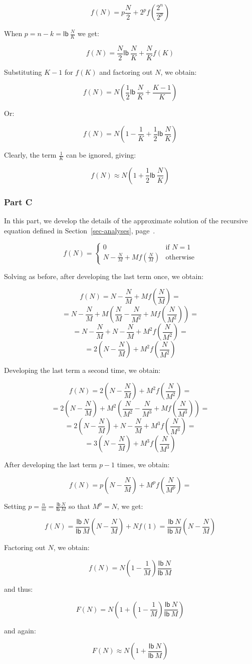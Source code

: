 \[ f(N) = p\frac{N}{2} + 2^pf(\frac{2^n}{2^p})\]

When $p = n - k = \mathsf{lb}~\frac{N}{K}$ we get:

\[ f(N) = \frac{N}{2}\mathsf{lb}~\frac{N}{K} + \frac{N}{K}f(K)\]

Substituting $K-1$ for $f(K)$ and factoring out $N$, we obtain:

\[ f(N) = N(\frac{1}{2}\mathsf{lb}~\frac{N}{K} + \frac{K - 1}{K})\]

Or:

\[ f(N) = N(1 - \frac{1}{K} + \frac{1}{2}\mathsf{lb}~\frac{N}{K})\]

Clearly, the term $\frac{1}{K}$ can be ignored, giving:

\[ f(N) \approx N(1 + \frac{1}{2}\mathsf{lb}~\frac{N}{K})\]

\subsubsection*{Part C}
In this part, we develop the details of the approximate solution
of the recursive equation defined in Section~\ref{sec-analyses},
page~\pageref{analyse3}.

\[ f(N) = \left\{ \begin{array}{ll}
                    0 & \mbox{if $N = 1$} \\
                    N - \frac{N}{M} + Mf(\frac{N}{M}) &\mbox{otherwise}
                  \end{array} \right. \]

Solving as before, after developing the last term once, we obtain:

\[ f(N) = N - \frac{N}{M} + Mf(\frac{N}{M}) = \]
\[ = N - \frac{N}{M} + M(\frac{N}{M} - \frac{N}{M^2} + Mf(\frac{N}{M^2})) = \]
\[ = N - \frac{N}{M} + N - \frac{N}{M} + M^2f(\frac{N}{M^2}) = \]
\[ = 2(N - \frac{N}{M}) + M^2f(\frac{N}{M^2}) \]

Developing the last term a second time, we obtain:

\[ f(N) = 2(N - \frac{N}{M}) + M^2f(\frac{N}{M^2}) = \]
\[ = 2(N - \frac{N}{M}) + M^2(\frac{N}{M^2} - \frac{N}{M^3} + Mf(\frac{N}{M^3})) = \]
\[ = 2(N - \frac{N}{M}) + N - \frac{N}{M} + M^3f(\frac{N}{M^3}) = \]
\[ = 3(N - \frac{N}{M}) + M^3f(\frac{N}{M^3}) \]

After developing the last term $p-1$ times, we obtain:

\[ f(N) = p(N - \frac{N}{M}) + M^pf(\frac{N}{M^p}) = \]

Setting $p = \frac{n}{m} = \frac{\mathsf{lb}~N}{\mathsf{lb}~M}$ so
that $M^p = N$, we get:

\[ f(N) = \frac{\mathsf{lb}~N}{\mathsf{lb}~M}(N - \frac{N}{M}) + Nf(1)
   = \frac{\mathsf{lb}~N}{\mathsf{lb}~M}(N - \frac{N}{M}) \]

Factoring out $N$, we obtain:

\[ f(N) = N(1 - \frac{1}{M})\frac{\mathsf{lb}~N}{\mathsf{lb}~M} \]

and thus:

\[ F(N) = N(1 + (1 - \frac{1}{M})\frac{\mathsf{lb}~N}{\mathsf{lb}~M}) \]

and again:

\[ F(N) \approx N(1 + \frac{\mathsf{lb}~N}{\mathsf{lb}~M}) \]
